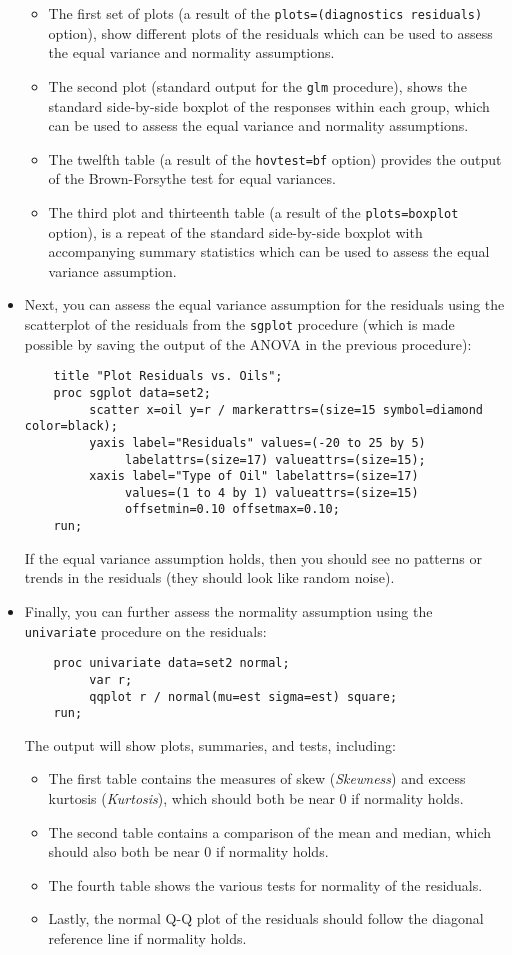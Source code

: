 \documentclass[11pt]{article}
\begin{document}
\begin{itemize}
	\begin{itemize}
		\item The first set of plots (a result of the \texttt{plots=(diagnostics residuals)} option), show different plots of the residuals which can be used to assess the equal variance and normality assumptions.
		\item The second plot (standard output for the \texttt{glm} procedure), shows the standard side-by-side boxplot of the responses within each group, which can be used to assess the equal variance and normality assumptions.
		\item The twelfth table (a result of the \texttt{hovtest=bf} option) provides the output of the Brown-Forsythe test for equal variances.
		\item The third plot and thirteenth table (a result of the \texttt{plots=boxplot} option), is a repeat of the standard side-by-side boxplot with accompanying summary statistics which can be used to assess the equal variance assumption.
	\end{itemize}	
	\item Next, you can assess the equal variance assumption for the residuals using the scatterplot of the residuals from the \texttt{sgplot} procedure (which is made possible by saving the output of the ANOVA in the previous procedure):
	\begin{verbatim}
	title "Plot Residuals vs. Oils";
	proc sgplot data=set2;
	     scatter x=oil y=r / markerattrs=(size=15 symbol=diamond color=black);
	     yaxis label="Residuals" values=(-20 to 25 by 5)
	          labelattrs=(size=17) valueattrs=(size=15);
	     xaxis label="Type of Oil" labelattrs=(size=17)
	          values=(1 to 4 by 1) valueattrs=(size=15)
	          offsetmin=0.10 offsetmax=0.10;
	run;
	\end{verbatim}
	If the equal variance assumption holds, then you should see no patterns or trends in the residuals (they should look like random noise).
	\item Finally, you can further assess the normality assumption using the \texttt{univariate} procedure on the residuals:
	\begin{verbatim}
	proc univariate data=set2 normal;
	     var r;
	     qqplot r / normal(mu=est sigma=est) square;
	run;
	\end{verbatim}
	The output will show plots, summaries, and tests, including:
	\begin{itemize}
		\item The first table contains the measures of skew (\textit{Skewness}) and excess kurtosis (\textit{Kurtosis}), which should both be near 0 if normality holds.
		\item The second table contains a comparison of the mean and median, which should also both be near 0 if normality holds.
		\item The fourth table shows the various tests for normality of the residuals.
		\item Lastly, the normal Q-Q plot of the residuals should follow the diagonal reference line if normality holds.
	\end{itemize}	 
\end{itemize}
\newpage
\end{document}
